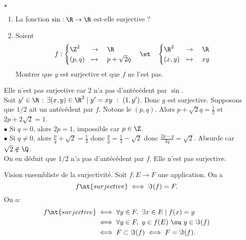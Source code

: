 \documentclass[11pt]{article}
\begin{document}
\begin{ex}{$\star$}{}
    \begin{enumerate}
        \item La fonction $\sin:\R\to\R$ est-elle surjective ?
        \item Soient
        \begin{equation*}
            f:\begin{cases}
                \Z^2 &\to \quad \R\\
                (p,q) &\mapsto \quad p+\sqrt{2}q
            \end{cases} \quad\et\quad \begin{cases}
                \R^2 &\to \quad \R\\
                (x,y) &\mapsto \quad xy
            \end{cases}
        \end{equation*}
        Montrer que $g$ est surjective et que $f$ ne l'est pas.
    \end{enumerate}
    \tcblower
     Elle n'est pas surjective car $2$ n'a pas d'antécédent par $\sin$.\\
     Soit $y'\in\R$ : $\exists (x,y)\in\R^2 \mid y'=xy ~:~ (1,y')$. Donc $g$ est surjective.\n
    Supposons que $1/2$ ait un antécédent par $f$. Notons le $(p,q)$. Alors $p+\sqrt{2}q=\frac{1}{2}$ et $2p+2\sqrt{2}=1$.\\
    $\bullet$ Si $q=0$, alors $2p=1$, impossible car $p\in\Z$.\\
    $\bullet$ Si $q\neq0$, alors $\frac{p}{q}+\sqrt{2}=\frac{1}{2}$ donc $\frac{p}{q}=\frac{1}{2}-\sqrt{2}$ donc $\frac{2p-q}{2q}=\sqrt{2}$. Absurde car $\sqrt{2}\notin\Q$.\\
    On en déduit que $1/2$ n'a pas d'antécédent par $f$. Elle n'est pas surjective.
\end{ex}

\begin{prop}{Vision ensembliste de la surjectivité.}{}
    Soit $f:E\to F$ une application. On a
    \begin{equation*}
        f \nt{ surjective} \iff \Im(f) = F.
    \end{equation*}
    \tcblower
    On a:
    \begin{align*}
        f \nt{ surjective} &\iff \forall y \in F, ~ \exists x \in E \mid f(x) = y\\
        &\iff \forall y \in F, ~ y \in f(E) ~\ou~ y\in\Im(f)\\
        &\iff F \subset \Im(f) \iff F = \Im(f). 
    \end{align*}
\end{prop}
\end{document}
